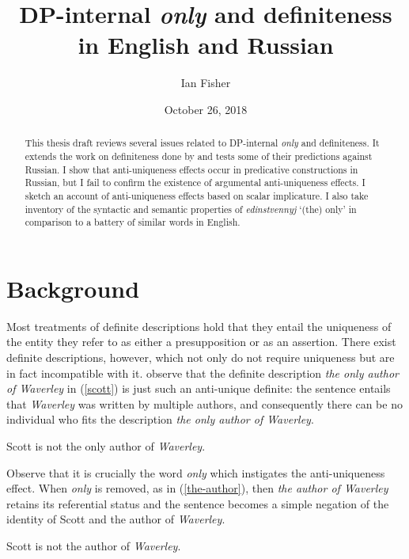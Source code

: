 \documentclass{article}
\title{DP-internal \textit{only} and definiteness in English and Russian}
\author{Ian Fisher}
\date{October 26, 2018}
\begin{document}
\maketitle


\begin{abstract}
This thesis draft reviews several issues related to DP-internal \textit{only} and definiteness. It extends the work on definiteness done by \citet{cb2015, cb2012a, cb2012b} and tests some of their predictions against Russian. I show that anti-uniqueness effects occur in predicative constructions in Russian, but I fail to confirm the existence of argumental anti-uniqueness effects. I sketch an account of anti-uniqueness effects based on scalar implicature. I also take inventory of the syntactic and semantic properties of \textit{edinstvennyj} `(the) only' in comparison to a battery of similar words in English.
\end{abstract}


\section{Background}
Most treatments of definite descriptions hold that they entail the uniqueness of the entity they refer to as either a presupposition or as an assertion. There exist definite descriptions, however, which not only do not require uniqueness but are in fact incompatible with it. \citet{cb2015} observe that the definite description \textit{the only author of Waverley} in (\ref{scott}) is just such an anti-unique definite: the sentence entails that \textit{Waverley} was written by multiple authors, and consequently there can be no individual who fits the description \textit{the only author of Waverley}.

\begin{exe}
	\ex \label{scott} Scott is not the only author of \textit{Waverley}.
\end{exe}

Observe that it is crucially the word \textit{only} which instigates the anti-uniqueness effect. When \textit{only} is removed, as in (\ref{the-author}), then \textit{the author of Waverley} retains its referential status and the sentence becomes a simple negation of the identity of Scott and the author of \textit{Waverley}.

\begin{exe}
	\ex \label{the-author} Scott is not the author of \textit{Waverley}.
\end{exe}
\end{document}
